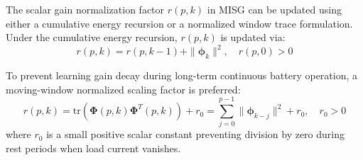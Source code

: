 The scalar gain normalization factor $r(p, k)$ in MISG can be updated using either a cumulative energy recursion or a normalized window trace formulation. Under the cumulative energy recursion, $r(p, k)$ is updated via:
\begin{equation}
r(p, k) = r(p, k-1) + \|\boldsymbol{\phi}_k\|^2, \quad r(p, 0) > 0
\label{eq:misg_r_cumulative}
\end{equation}

To prevent learning gain decay during long-term continuous battery operation, a moving-window normalized scaling factor is preferred:
\begin{equation}
r(p, k) = \text{tr}\left( \boldsymbol{\Phi}(p, k) \boldsymbol{\Phi}^T(p, k) \right) + r_0 = \sum_{j=0}^{p-1} \|\boldsymbol{\phi}_{k-j}\|^2 + r_0, \quad r_0 > 0
\label{eq:misg_r_normalized}
\end{equation}
where $r_0$ is a small positive scalar constant preventing division by zero during rest periods when load current vanishes.


